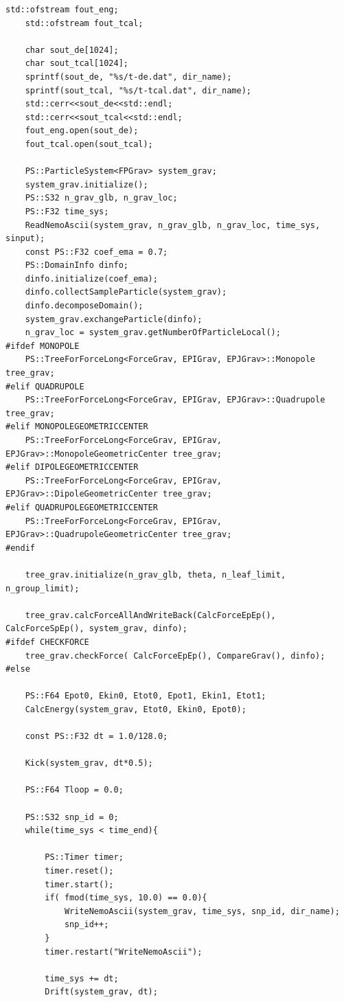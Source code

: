 \begin{lstlisting}[caption=重力$N$体計算]
    std::ofstream fout_eng;
    std::ofstream fout_tcal;
    
    char sout_de[1024];
    char sout_tcal[1024];
    sprintf(sout_de, "%s/t-de.dat", dir_name);
    sprintf(sout_tcal, "%s/t-tcal.dat", dir_name);
    std::cerr<<sout_de<<std::endl;
    std::cerr<<sout_tcal<<std::endl;
    fout_eng.open(sout_de);
    fout_tcal.open(sout_tcal);

    PS::ParticleSystem<FPGrav> system_grav;
    system_grav.initialize();
    PS::S32 n_grav_glb, n_grav_loc;
    PS::F32 time_sys;
    ReadNemoAscii(system_grav, n_grav_glb, n_grav_loc, time_sys, sinput);
    const PS::F32 coef_ema = 0.7;
    PS::DomainInfo dinfo;
    dinfo.initialize(coef_ema);
    dinfo.collectSampleParticle(system_grav);
    dinfo.decomposeDomain();
    system_grav.exchangeParticle(dinfo);
    n_grav_loc = system_grav.getNumberOfParticleLocal();
#ifdef MONOPOLE
    PS::TreeForForceLong<ForceGrav, EPIGrav, EPJGrav>::Monopole tree_grav;
#elif QUADRUPOLE
    PS::TreeForForceLong<ForceGrav, EPIGrav, EPJGrav>::Quadrupole tree_grav;
#elif MONOPOLEGEOMETRICCENTER
    PS::TreeForForceLong<ForceGrav, EPIGrav, EPJGrav>::MonopoleGeometricCenter tree_grav;
#elif DIPOLEGEOMETRICCENTER
    PS::TreeForForceLong<ForceGrav, EPIGrav, EPJGrav>::DipoleGeometricCenter tree_grav;
#elif QUADRUPOLEGEOMETRICCENTER
    PS::TreeForForceLong<ForceGrav, EPIGrav, EPJGrav>::QuadrupoleGeometricCenter tree_grav;
#endif

    tree_grav.initialize(n_grav_glb, theta, n_leaf_limit, n_group_limit);

    tree_grav.calcForceAllAndWriteBack(CalcForceEpEp(), CalcForceSpEp(), system_grav, dinfo);
#ifdef CHECKFORCE
    tree_grav.checkForce( CalcForceEpEp(), CompareGrav(), dinfo);
#else

    PS::F64 Epot0, Ekin0, Etot0, Epot1, Ekin1, Etot1;
    CalcEnergy(system_grav, Etot0, Ekin0, Epot0);

    const PS::F32 dt = 1.0/128.0;

    Kick(system_grav, dt*0.5);

    PS::F64 Tloop = 0.0;

    PS::S32 snp_id = 0;
    while(time_sys < time_end){

        PS::Timer timer;
        timer.reset();
        timer.start();
        if( fmod(time_sys, 10.0) == 0.0){
            WriteNemoAscii(system_grav, time_sys, snp_id, dir_name);
            snp_id++;
        }
        timer.restart("WriteNemoAscii");

        time_sys += dt;
        Drift(system_grav, dt);


\end{lstlisting}
